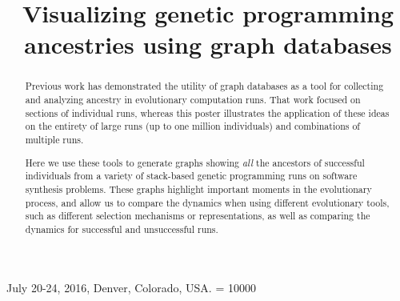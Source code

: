 \documentclass{sig-alternate}
\begin{document}
 {July 20-24, 2016, Denver, Colorado, USA.}
\widowpenalty = 10000
    
\title{Visualizing genetic programming ancestries using graph databases}


\maketitle

\begin{abstract}


Previous work has demonstrated the utility of graph databases as a tool for collecting and analyzing ancestry in evolutionary computation runs. That work focused on sections of individual runs, whereas this poster illustrates the application of these ideas on the entirety of large runs (up to one million individuals) and combinations of multiple runs.

Here we use these tools to generate graphs showing \emph{all} the ancestors of successful individuals from a variety of stack-based genetic programming runs on software synthesis problems. These graphs highlight important moments in the evolutionary process, and allow us to compare the dynamics when using different evolutionary tools, such as different selection mechanisms or representations, as well as comparing the dynamics for successful and unsuccessful runs.

\end{abstract}
\end{document}
